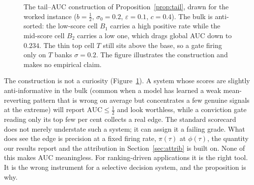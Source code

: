 \documentclass[10pt, a4paper, oneside]{article}
\theoremstyle{definition}
\theoremstyle{plain}
\begin{document}
\begin{figure}[t]
\centering
{}
\caption{The tail--AUC construction of Proposition~\ref{prop:tail}, drawn for the
worked instance ($b=\tfrac12$, $\sigma_0=0.2$, $\varepsilon=0.1$, $c=0.4$). The bulk is
anti-sorted: the low-score cell $B_1$ carries a high positive rate while the mid-score
cell $B_2$ carries a low one, which drags global AUC down to $0.234$. The thin top cell
$T$ still sits above the base, so a gate firing only on $T$ banks $\sigma=0.2$. The
figure illustrates the construction and makes no empirical claim.}
\label{fig:construction}
\end{figure}

The construction is not a curiosity (Figure~\ref{fig:construction}). A system whose scores are slightly
anti-informative in the bulk (common when a model has learned a weak mean-reverting
pattern that is wrong on average but concentrates a few genuine signals at the
extreme) will report $\mathrm{AUC}\le\tfrac12$ and look worthless, while a conviction
gate reading only its top few per cent collects a real edge. The standard scorecard
does not merely understate such a system; it can assign it a failing grade. What does
see the edge is precision at a fixed firing rate, $\pi(\tau)$ at $\phi(\tau)$, the
quantity our results report and the attribution in Section~\ref{sec:attrib} is built
on. None of this makes AUC meaningless. For ranking-driven applications it is the
right tool. It is the wrong instrument for a selective decision system, and the
proposition is why.
\end{document}
